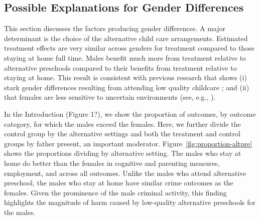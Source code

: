 \subsection{Possible Explanations for Gender Differences}

This section discusses the factors producing gender differences. A major determinant is the choice of the alternative child care arrangements. 
Estimated treatment effects are very similar across genders for treatment compared to those staying at home full time. Males benefit much more from treatment relative to alternative preschools compared to their benefits from treatment relative to staying at home. This result is consistent with previous research that shows (i) stark gender differences resulting from attending low quality childcare \citep{Kottelenberg-Lehrer_2014_Gender-Effects,Baker_Gruber_Milligan_2015_Noncog_Defects}; and (ii) that females are less sensitive to uncertain environments (see, e.g., \citealp{Autor-etal_2015_Family-Disadvantage}).

In the Introduction (Figure 1?), we show the proportion of outcomes, by outcome category, for which the males exceed the females. Here, we further divide the control group by the alternative settings and both the treatment and control groups by father present, an important moderator. Figure~\ref{fig:proportion-altpre} shows the proportions dividing by alternative setting. The males who stay at home do better than the females in cognitive and parenting measures, employment, and across all outcomes. Unlike the males who attend alternative preschool, the males who stay at home have similar crime outcomes as the females. Given the prominence of the male criminal activity, this finding highlights the magnitude of harm caused by low-quality alternative preschools for the males. 

